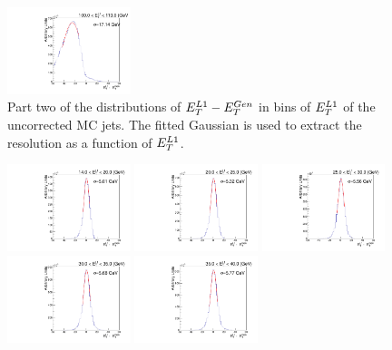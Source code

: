 \begin{figure}[h!]
          \includegraphics[width=0.32\textwidth]{detector/l1jet/gaussfits//ptBin_12_PtAll_u.pdf}
    \caption{Part two of the distributions of $E_{T}^{L1}-E_{T}^{Gen}$ in bins of $E_{T}^{L1}$ of the uncorrected MC jets. 
	The fitted Gaussian is used to extract the resolution as a function of $E_{T}^{L1}$.}
    \label{fig:mcresfits_u_p2}
\end{figure}
\begin{figure}[h!]
    \centering
          \includegraphics[width=0.32\textwidth]{detector/l1jet/gaussfits//ptBin_0_PtAll_pf.pdf}
          \includegraphics[width=0.32\textwidth]{detector/l1jet/gaussfits//ptBin_1_PtAll_pf.pdf}
          \includegraphics[width=0.32\textwidth]{detector/l1jet/gaussfits//ptBin_2_PtAll_pf.pdf}\\
          \includegraphics[width=0.32\textwidth]{detector/l1jet/gaussfits//ptBin_3_PtAll_pf.pdf}
          \includegraphics[width=0.32\textwidth]{detector/l1jet/gaussfits//ptBin_4_PtAll_pf.pdf}

\end{figure}
